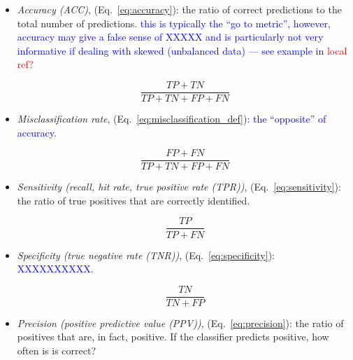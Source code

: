 \begin{itemize}[noitemsep,topsep=0pt]
	
\item \textit{Accuracy (ACC)}, (Eq.~\ref{eq:accuracy}): the ratio of correct predictions to the total number of predictions. \textcolor{blue}{this is typically the ``go to metric'', however, accuracy may give a false sense of XXXXX and is particularly not very informative if dealing with skewed (unbalanced data) --- see example in \textcolor{red}{local ref?}}

\begin{equation}
{\frac{TP+TN}{TP+TN+FP+FN}}
\label{eq:accuracy}
\end{equation}

\item \textit{Misclassification rate}, (Eq.~\ref{eq:misclassification_def}): \textcolor{blue}{the ``opposite'' of accuracy}.

\begin{equation}
{\frac{FP+FN}{TP+TN+FP+FN}}
\label{eq:misclassification_def}
\end{equation}


\item \textit{Sensitivity (recall, hit rate, true positive rate (TPR))}, (Eq.~\ref{eq:sensitivity}): the ratio of true positives that are correctly identified.

\begin{equation}
{\frac{TP}{TP+FN}}
\label{eq:sensitivity}
\end{equation}

\item \textit{Specificity (true negative rate (TNR))}, (Eq.~\ref{eq:specificity}): \textcolor{blue}{XXXXXXXXXX}.

\begin{equation}
{\frac{TN}{TN+FP}}
\label{eq:specificity}
\end{equation}

\item \textit{Precision (positive predictive value (PPV))}, (Eq.~\ref{eq:precision}): the ratio of positives that are, in fact, positive. If the classifier predicts positive, how often is is correct?


\end{itemize}
